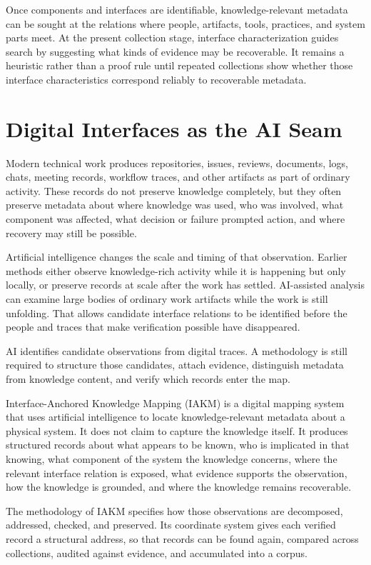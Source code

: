 \documentclass[preprints,article,submit,moreauthors]{Definitions/mdpi}
\begin{document}
Once components and interfaces are identifiable, knowledge-relevant metadata can be sought at the relations where people, artifacts, tools, practices, and system parts meet. At the present collection stage, interface characterization guides search by suggesting what kinds of evidence may be recoverable. It remains a heuristic rather than a proof rule until repeated collections show whether those interface characteristics correspond reliably to recoverable metadata.


\section{Digital Interfaces as the AI Seam}\label{sec:4}

Modern technical work produces repositories, issues, reviews, documents, logs, chats, meeting records, workflow traces, and other artifacts as part of ordinary activity. These records do not preserve knowledge completely, but they often preserve metadata about where knowledge was used, who was involved, what component was affected, what decision or failure prompted action, and where recovery may still be possible.

Artificial intelligence changes the scale and timing of that observation. Earlier methods either observe knowledge-rich activity while it is happening but only locally, or preserve records at scale after the work has settled. AI-assisted analysis can examine large bodies of ordinary work artifacts while the work is still unfolding. That allows candidate interface relations to be identified before the people and traces that make verification possible have disappeared.

AI identifies candidate observations from digital traces. A methodology is still required to structure those candidates, attach evidence, distinguish metadata from knowledge content, and verify which records enter the map.

Interface-Anchored Knowledge Mapping (IAKM) is a digital mapping system that uses artificial intelligence to locate knowledge-relevant metadata about a physical system. It does not claim to capture the knowledge itself. It produces structured records about what appears to be known, who is implicated in that knowing, what component of the system the knowledge concerns, where the relevant interface relation is exposed, what evidence supports the observation, how the knowledge is grounded, and where the knowledge remains recoverable.

The methodology of IAKM specifies how those observations are decomposed, addressed, checked, and preserved. Its coordinate system gives each verified record a structural address, so that records can be found again, compared across collections, audited against evidence, and accumulated into a corpus.
\end{document}
